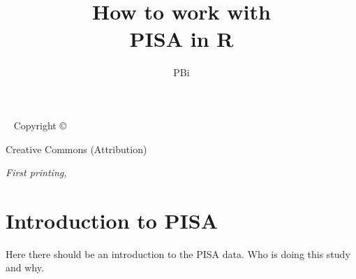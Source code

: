\documentclass{tufte-book}
\title{ How to work with \\ PISA in R}
\author[PBi]{PBi}
\begin{document}
\frontmatter
%

\maketitle


\newpage
\begin{fullwidth}
~\vfill
\thispagestyle{empty}
\setlength{\parindent}{0pt}
\setlength{\parskip}{\baselineskip}
Copyright \copyright\ \the\year\ \thanklessauthor

\par{}

\par{}

\par Creative Commons (Attribution)

\par\textit{First printing, \monthyear}
\end{fullwidth}

\tableofcontents



%

\cleardoublepage

\chapter{Introduction to PISA}
Here there should be an introduction to the PISA data. Who is doing this study and why.
\end{document}
